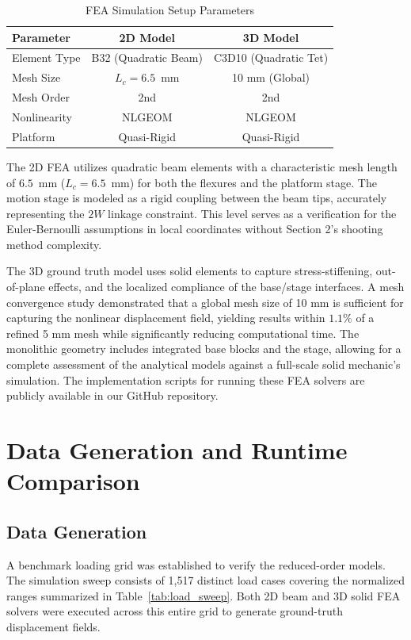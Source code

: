 \documentclass[colorlinks,upint,subscriptcorrection,varvw,hyphenate,balance]{asmeconf} %
\begin{document}
\begin{table}[ht]
\centering
\caption{FEA Simulation Setup Parameters}
\label{tab:fea_setup}
\begin{tabular}{lcc}
\toprule
\textbf{Parameter} & \textbf{2D Model} & \textbf{3D Model} \\
\midrule
Element Type & B32 (Quadratic Beam) & C3D10 (Quadratic Tet) \\
Mesh Size & $L_c = 6.5$~mm & 10 mm (Global) \\
Mesh Order & 2nd & 2nd \\
Nonlinearity & NLGEOM & NLGEOM \\
Platform &  Quasi-Rigid & Quasi-Rigid \\
\bottomrule
\end{tabular}
\end{table}

The 2D FEA utilizes quadratic beam elements with a characteristic mesh length of $6.5$~mm ($L_c = 6.5$~mm) for both the flexures and the platform stage. The motion stage is modeled as a rigid coupling between the beam tips, accurately representing the $2W$ linkage constraint. This level serves as a verification for the Euler-Bernoulli assumptions in local coordinates without Section 2's shooting method complexity.

The 3D ground truth model uses solid elements to capture stress-stiffening, out-of-plane effects, and the localized compliance of the base/stage interfaces. A mesh convergence study demonstrated that a global mesh size of 10 mm is sufficient for capturing the nonlinear displacement field, yielding results within $1.1\%$ of a refined 5 mm mesh while significantly reducing computational time. The monolithic geometry includes integrated base blocks and the stage, allowing for a complete assessment of the analytical models against a full-scale solid mechanic's simulation. The implementation scripts for running these FEA solvers are publicly available in our GitHub repository.


\section{Data Generation and Runtime Comparison}
\subsection{Data Generation}
A benchmark loading grid was established to verify the reduced-order models. The simulation sweep consists of 1,517 distinct load cases covering the normalized ranges summarized in Table~\ref{tab:load_sweep}. Both 2D beam and 3D solid FEA solvers were executed across this entire grid to generate ground-truth displacement fields. 
\end{document}
